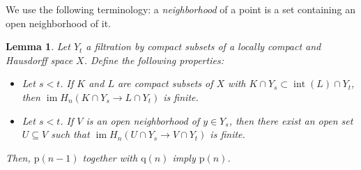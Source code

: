 \documentclass{amsart}
\newtheorem{lemma}[theorem]{Lemma}
\theoremstyle{definition}
\DeclareMathOperator{\im}{im}
\DeclareMathOperator{\interior}{int}
\newcommand{\p}{\mathrm{p}}
\newcommand{\q}{\mathrm{q}}
\begin{document}
	We use the following terminology: a \textit{neighborhood} of a point is a set containing an open neighborhood of it.
	
	\begin{lemma} 
		Let $Y_t$ a filtration by compact subsets of a locally compact and Hausdorff space $X$. Define the following properties:
		\begin{itemize}
			\item[$\p(n)$] Let $s < t$. If $K$ and $L$ are compact subsets of $X$ with $K \cap Y_s \subset \interior(L) \cap Y_t$, then $\im H_n\left(K \cap Y_s \to L \cap Y_t\right)$ is finite.
			\item[$\q(n)$] Let $s < t$. If $V$ is an open neighborhood of $y \in Y_s$, then there exist an open set $U \subseteq V$ such that $\im H_n\left(U \cap Y_s \to V \cap Y_t\right)$ is finite.
		\end{itemize}
		Then, $\p(n-1)$ together with $\q(n)$ imply $\p(n)$.
	\end{lemma}
	
\end{document}
